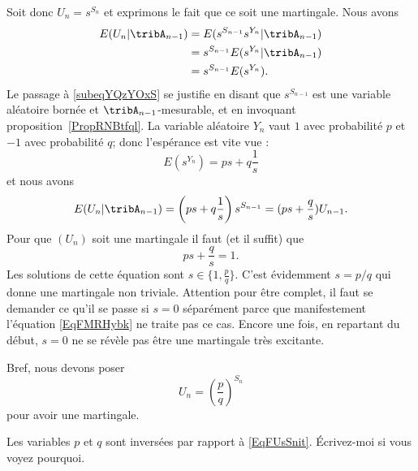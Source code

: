 Soit donc \( U_n=s^{S_n}\) et exprimons le fait que ce soit une martingale. Nous avons
\begin{subequations}
	\begin{align}
		E(U_n|\tribA_{n-1}) & =E(s^{S_{n-1}}s^{Y_n}|\tribA_{n-1})                         \\
		                    & =s^{S_{n-1}}E(s^{Y_n}|\tribA_{n-1})    \label{subeqYQzYOxS} \\
		                    & =s^{S_{n-1}}E(s^{Y_n}).
	\end{align}
\end{subequations}
Le passage à \eqref{subeqYQzYOxS} se justifie en disant que \( s^{S_{n-1}}\) est une variable aléatoire bornée et \( \tribA_{n-1}\)-mesurable, et en invoquant proposition~\ref{PropRNBtfql}. La variable aléatoire \( Y_n\) vaut \( 1\) avec probabilité \( p\) et \( -1\) avec probabilité \( q\); donc l'espérance est vite vue :
\begin{equation}
	E(s^{Y_n})=ps+q\frac{1}{ s }
\end{equation}
et nous avons
\begin{equation}
	E(U_n|\tribA_{n-1})=\left( ps+q\frac{1}{ s } \right)s^{S_{n-1}}=(ps+\frac{ q }{ s })U_{n-1}.
\end{equation}
Pour que \( (U_n)\) soit une martingale il faut (et il suffit) que
\begin{equation}    \label{EqFMRHybk}
	ps+\frac{ q }{ s }=1.
\end{equation}
Les solutions de cette équation sont \( s\in\{ 1,\frac{ p }{ q } \}\). C'est évidemment \( s=p/q\) qui donne une martingale non triviale. Attention pour être complet, il faut se demander ce qu'il se passe si \( s=0\) séparément parce que manifestement l'équation \eqref{EqFMRHybk} ne traite pas ce cas. Encore une fois, en repartant du début, \( s=0\) ne se révèle pas être une martingale très excitante.

Bref, nous devons poser
\begin{equation}
	U_n=\left( \frac{ p }{ q } \right)^{S_n}
\end{equation}
pour avoir une martingale.

\begin{probleme}
	Les variables \( p\) et \( q\) sont inversées par rapport à \eqref{EqFUsSnit}. Écrivez-moi si vous voyez pourquoi.
\end{probleme}
